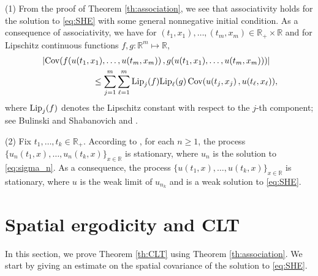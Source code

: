 \documentclass[12pt, reqno]{amsart}
\newcommand{\R}{{\mathbb{R}}}
\newcommand{\<}{\langle}
\renewcommand{\>}{\rangle}
\newcommand{\lip}{\text{\rm Lip}}
\DeclareMathOperator{\Cov}{\text{\rm Cov}}
\begin{document}
\begin{remark}\label{rem:sta}
(1) From the proof of Theorem \ref{th:association}, we see that 
associativity holds for the solution to \eqref{eq:SHE} with some general 
nonnegative initial condition.  As a consequence of associativity, we have 
for $(t_1, x_1), \ldots, (t_m, x_m)\in \R_+\times\R$ and for Lipschitz 
continuous functions $f, g: \R^m\mapsto \R$, 
\begin{align}\label{Newman2}
         & \left|\Cov(f(u(t_1,x_1), \ldots, u(t_m,x_m))\,, g(u(t_1,x_1), \ldots, u(t_m,x_m)))\right| \nonumber\\
          &\qquad\qquad\qquad \leq \sum_{j=1}^m\sum_{\ell=1}^m
           \lip_j(f)\lip_\ell(g) \Cov(u(t_j,x_j)\,, u(t_\ell, x_\ell)),
\end{align}
where $\lip_j(f)$ denotes the Lipschitz constant with respect to the $j$-th component; see Bulinski and Shabanovich \cite{BuS98} and  \cite[Theorem 6.2.6]{PR12}.

\smallskip
(2) Fix $t_1, \ldots, t_k\in \R_+$. According to \cite[Lemma 18]{Dal99}, for each $n\geq1$, the process $\{u_n(t_1, x), \ldots, u_n(t_k,x)\}_{x\in \R}$ is stationary, where $u_n$ is the solution to \eqref{eq:sigma_n}.  As a consequence, the process 
$\{u(t_1, x), \ldots, u(t_k,x)\}_{x\in \R}$ is stationary, where $u$ is the weak limit of $u_{n_k}$ and is a weak solution to \eqref{eq:SHE}.

\end{remark}


\section{Spatial ergodicity and CLT}\label{sec:CLT}

In this section, we prove Theorem \ref{th:CLT} using Theorem \ref{th:association}. We  start by giving an estimate on the spatial covariance of the solution to \eqref{eq:SHE}.
\end{document}
